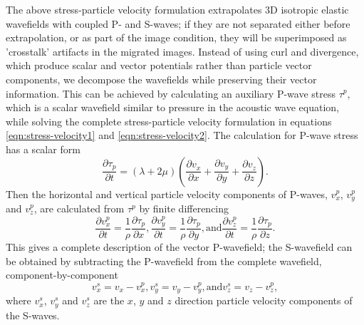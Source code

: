 \documentclass[manuscript,ulem,graphix,revised]{geophysics}
\begin{document}
The above stress-particle velocity formulation extrapolates 3D isotropic elastic wavefields with coupled P- and S-waves; if they are not separated either before extrapolation, or as part of the image condition, they will be superimposed as 'crosstalk' artifacts in the migrated images. Instead of using curl and divergence, which produce scalar and vector potentials rather than particle vector components\citep{aki80,yan08}, we decompose the wavefields while preserving their vector information. This can be achieved by calculating an auxiliary P-wave stress $\tau^p$, which is a scalar wavefield similar to pressure in the acoustic wave equation, while solving the complete stress-particle velocity formulation in equations \ref{eqn:stress-velocity1} and \ref{eqn:stress-velocity2}. The calculation for P-wave stress has a scalar form \citep{xiao10} 
\begin{equation}
\frac{\partial\tau_{p}}{\partial t}=(\lambda+2\mu)(\frac{\partial v_x}{\partial x}+\frac{\partial v_y}{\partial y}+\frac{\partial v_z}{\partial z}).
\label{eqn:tau-p}
\end{equation}
Then the horizontal and vertical particle velocity components of P-waves, $v^p_{x}$, $v^p_{y}$ and $v^p_{z}$, are calculated from $\tau^p$ by finite differencing
\begin{subequations}
\begin{equation}
\frac{\partial v^p_{x}}{\partial t}=\frac{1}{\rho}\frac{\partial\tau _{p}}{\partial x},
\end{equation}
\begin{equation}
\frac{\partial v^p_{y}}{\partial t}=\frac{1}{\rho}\frac{\partial\tau _{p}}{\partial y},
\end{equation}
\text{and}
\begin{equation}
\frac{\partial v^p_{z}}{\partial t}=\frac{1}{\rho}\frac{\partial\tau _{p}}{\partial z}.
\end{equation}
\label{eqn:vp}
\end{subequations}
This gives a complete description of the vector P-wavefield; the S-wavefield can be obtained by subtracting the P-wavefield from the complete wavefield, component-by-component
\begin{subequations}
\begin{equation}
v^s_{x}=v_x-v^p_{x},
\end{equation}
\begin{equation}
v^s_{y}=v_y-v^p_{y},
\end{equation}
\text{and}
\begin{equation}
v^s_{z}=v_z-v^p_{z},
\end{equation}
\label{eqn:vs}
\end{subequations}
where $v^s_x$,  $v^s_y$ and $v^s_z$ are the $x$, $y$ and $z$ direction particle velocity components of the S-waves. 
\end{document}
